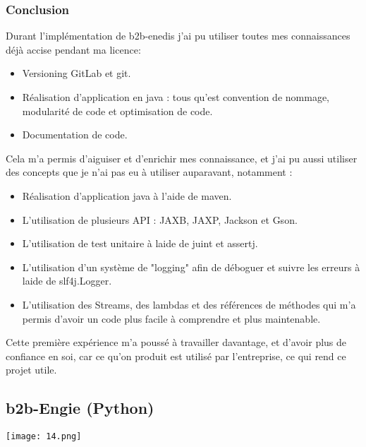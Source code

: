 \subsubsection{Conclusion}
Durant l’implémentation de b2b-enedis j'ai pu utiliser toutes mes connaissances déjà accise pendant ma licence:
\begin{itemize}
	\item Versioning GitLab et git.
	\item Réalisation d’application en java : tous qu'est convention de nommage, modularité de code et optimisation de code.
	\item Documentation de code.
\end{itemize}
Cela m'a permis d’aiguiser et d’enrichir mes connaissance, et j'ai pu aussi utiliser des concepts que je n'ai pas eu à utiliser auparavant, notamment :
\begin{itemize}
	\item Réalisation d'application java à l'aide de maven.
	\item L'utilisation de plusieurs API : JAXB, JAXP, Jackson et Gson.
	\item L'utilisation de test unitaire à laide de juint et assertj.
	\item L'utilisation d'un système de "logging" afin de déboguer et suivre les erreurs à laide de slf4j.Logger.
	\item L'utilisation des Streams, des lambdas et des références de méthodes qui m'a permis d'avoir un code plus facile à comprendre et plus maintenable.
\end{itemize} 
Cette première expérience m'a poussé à travailler davantage, et d'avoir plus de confiance en soi, car ce qu'on produit est utilisé par l'entreprise, ce qui rend ce projet utile.
\subsection{b2b-Engie (Python)}
\begin{center}
	\texttt{[image: 14.png]}
\end{center}
